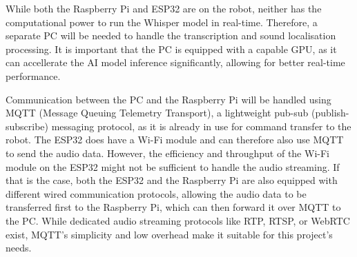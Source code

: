 While both the Raspberry Pi and ESP32 are on the robot, neither has the computational power to run the Whisper model in real-time. Therefore, a separate PC will be needed to handle the transcription and sound localisation processing. It is important that the PC is equipped with a capable GPU, as it can accellerate the AI model inference significantly, allowing for better real-time performance.

Communication between the PC and the Raspberry Pi will be handled using MQTT (Message Queuing Telemetry Transport), a lightweight pub-sub (publish-subscribe) messaging protocol, as it is already in use for command transfer to the robot. The ESP32 does have a Wi-Fi module and can therefore also use MQTT to send the audio data. However, the efficiency and throughput of the Wi-Fi module on the ESP32 might not be sufficient to handle the audio streaming. If that is the case, both the ESP32 and the Raspberry Pi are also equipped with different wired communication protocols, allowing the audio data to be transferred first to the Raspberry Pi, which can then forward it over MQTT to the PC. While dedicated audio streaming protocols like RTP, RTSP, or WebRTC exist, MQTT's simplicity and low overhead make it suitable for this project's needs.